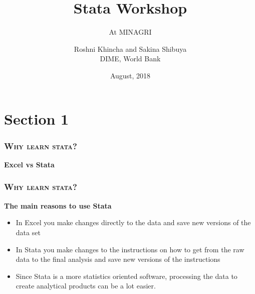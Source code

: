 \documentclass[10pt]{beamer}
\title{Stata Workshop} %
\subtitle{At MINAGRI} %
\author{Roshni Khincha and Sakina Shibuya \\ DIME, World Bank}
\date{August, 2018}
\begin{document}
		
	\maketitle

\section{Section 1}

	\begin{frame}
	
		\frametitle{\textsc{Why learn stata?}}
		\begin{center}
			\textbf{Excel vs Stata} \\ 
		\end{center}
	
	\end{frame}

	
	\begin{frame}
		\frametitle{\textsc{Why learn stata?}}
		\begin{center}
			\Large\textbf{The main reasons to use Stata}
		\end{center}
		\begin{itemize}
			\item In Excel you make changes directly to the data and save new versions of the data set
		
			\item In Stata you make changes to the instructions on how to get from the raw data to the final analysis and save new versions of the instructions
		
			\item Since Stata is a more statistics oriented software, processing the data to create analytical products can be a lot easier. 
		
		\end{itemize}
	\end{frame}
\end{document}
